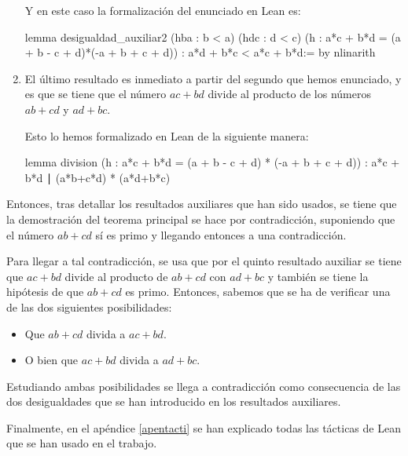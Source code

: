 \begin{enumerate}
  Y en este caso la formalización del enunciado en Lean es:
  \begin{leancode}
  lemma desigualdad_auxiliar2
    (hba : b < a)
    (hdc : d < c)
    (h : a*c + b*d = (a + b - c + d)*(-a + b + c + d))
    : a*d + b*c < a*c + b*d:=
    by nlinarith
  \end{leancode}

\item El último resultado es inmediato a partir del segundo que hemos
  enunciado, y es que se tiene que el número \(ac+bd\) divide al producto de los
  números \(ab+cd\) y \(ad+bc\).

  Esto lo hemos formalizado en Lean de la siguiente manera:

  \begin{leancode}
  lemma division
    (h : a*c + b*d = (a + b - c + d) * (-a + b + c + d))
    : a*c + b*d ∣ (a*b+c*d) * (a*d+b*c)
  \end{leancode}
  
\end{enumerate}

Entonces, tras detallar los resultados auxiliares que han sido usados, se tiene
que la demostración del teorema principal se hace por contradicción, suponiendo
que el número \(ab+cd\) sí es primo y llegando entonces a una contradicción.

Para llegar a tal contradicción, se usa que por el quinto resultado auxiliar se
tiene que \(ac+bd\) divide al producto de \(ab+cd\) con \(ad+bc\) y también
se tiene la hipótesis de que \(ab+cd\) es primo. Entonces, sabemos que se ha
de verificar una de las dos siguientes posibilidades:
\begin{itemize}
\item Que \(ab+cd\) divida a \(ac+bd\).

\item O bien que \(ac+bd\) divida a \(ad+bc\).
\end{itemize}

Estudiando ambas posibilidades se llega a contradicción como consecuencia
de las dos desigualdades que se han introducido en los resultados auxiliares.

Finalmente, en el apéndice \ref{apentacti} se han explicado todas
las tácticas de Lean que se han usado en el trabajo.


